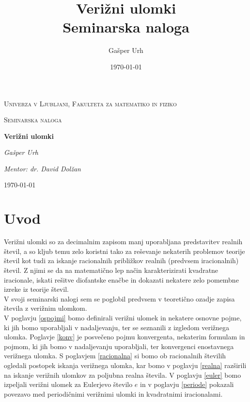 \documentclass[a4paper,12pt]{article}
\title{\textbf{\huge{Verižni ulomki}\\\normalsize{Seminarska naloga}}}
\author{Gašper Urh}
\date{\today}
\theoremstyle{definition}
\theoremstyle{proposition}
\theoremstyle{theorem}
\theoremstyle{lemma}
\begin{document}
\begin{titlepage}
	\centering
	{\scshape\LARGE Univerza v Ljubljani, Fakulteta za matematiko in fiziko\par}
	\vspace{1cm}
	{\scshape\Large Seminarska naloga\par}
	\vspace{1.5cm}
	{\huge\bfseries Verižni ulomki\par}
	\vspace{2cm}
	{\Large\itshape Gašper Urh\par}

	\vfill

	{\textit{Mentor: dr. David Dolžan}}\par
	\vspace{1cm}
	{\large \today\par}
\end{titlepage}

\tableofcontents
\newpage

\section{Uvod}

Verižni ulomki so za decimalnim zapisom manj uporabljana predstavitev realnih števil, a so kljub temu zelo koristni tako za reševanje nekaterih problemov teorije števil kot tudi za iskanje racionalnih približkov realnih (predvsem iracionalnih) števil. Z njimi se da na matematično lep način karakterizirati kvadratne iracionale, iskati rešitve diofantske enačbe in dokazati nekatere zelo pomembne izreke iz teorije števil. \\
V svoji seminarski nalogi sem se poglobil predvsem v teoretično ozadje zapisa števila z verižnim ulomkom.\\
V poglavju \ref{ospojmi} bomo definirali verižni ulomek in nekatere osnovne pojme, ki jih bomo uporabljali v nadaljevanju, ter se seznanili z izgledom verižnega ulomka. Poglavje \ref{konv} je posvečeno pojmu konvergenta, nekaterim formulam in pojmom, ki jih bomo v nadaljevanju uporabljali, ter konvergenci enostavnega verižnega ulomka. S poglavjem \ref{racionalna} si bomo ob racionalnih številih ogledali postopek iskanja verižnega ulomka, kar bomo v poglavju \ref{realna} razširili na iskanje verižnih ulomkov za poljubna realna števila. V poglavju \ref{euler} bomo izpeljali verižni ulomek za Eulerjevo število $e$ in v poglavju \ref{periode} pokazali povezavo med periodičnimi verižnimi ulomki in kvadratnimi iracionalami.
\end{document}
